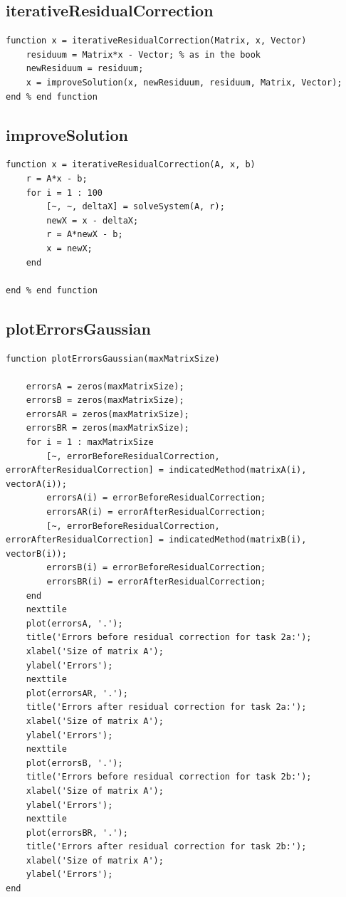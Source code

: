 \subsection{iterativeResidualCorrection}
\begin{simplechar}
\begin{lstlisting}
function x = iterativeResidualCorrection(Matrix, x, Vector)
    residuum = Matrix*x - Vector; % as in the book
    newResiduum = residuum;
    x = improveSolution(x, newResiduum, residuum, Matrix, Vector);
end % end function
\end{lstlisting}
\end{simplechar}

\newpage
\subsection{improveSolution}
\begin{simplechar}
\begin{lstlisting}
function x = iterativeResidualCorrection(A, x, b)
    r = A*x - b;
    for i = 1 : 100
        [~, ~, deltaX] = solveSystem(A, r);
        newX = x - deltaX;
        r = A*newX - b;
        x = newX;
    end

end % end function

\end{lstlisting}
\end{simplechar}

\newpage
\hypertarget{function2_plot}{\subsection{plotErrorsGaussian}}
\begin{simplechar}
\begin{lstlisting}
function plotErrorsGaussian(maxMatrixSize)

    errorsA = zeros(maxMatrixSize);
    errorsB = zeros(maxMatrixSize);
    errorsAR = zeros(maxMatrixSize);
    errorsBR = zeros(maxMatrixSize);
    for i = 1 : maxMatrixSize
        [~, errorBeforeResidualCorrection, errorAfterResidualCorrection] = indicatedMethod(matrixA(i), vectorA(i));
        errorsA(i) = errorBeforeResidualCorrection;
        errorsAR(i) = errorAfterResidualCorrection;
        [~, errorBeforeResidualCorrection, errorAfterResidualCorrection] = indicatedMethod(matrixB(i), vectorB(i));
        errorsB(i) = errorBeforeResidualCorrection;
        errorsBR(i) = errorAfterResidualCorrection;
    end
    nexttile
    plot(errorsA, '.');
    title('Errors before residual correction for task 2a:');
    xlabel('Size of matrix A');
    ylabel('Errors');
    nexttile
    plot(errorsAR, '.');
    title('Errors after residual correction for task 2a:');
    xlabel('Size of matrix A');
    ylabel('Errors');
    nexttile
    plot(errorsB, '.');
    title('Errors before residual correction for task 2b:');
    xlabel('Size of matrix A');
    ylabel('Errors');
    nexttile
    plot(errorsBR, '.');
    title('Errors after residual correction for task 2b:');
    xlabel('Size of matrix A');
    ylabel('Errors');
end
\end{lstlisting}
\end{simplechar}


